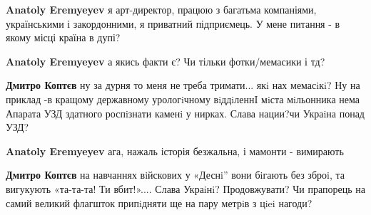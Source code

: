 \begin{itemize}
\begin{itemize}
\begin{itemize}
 
\textbf{Anatoly Eremyeyev} я арт-директор, працюю з багатьма компаніями, українськими і закордонними, я приватний підприємець. У мене питання - в якому місці країна в дупі?

 
\textbf{Anatoly Eremyeyev} а якись факти є? Чи тільки фотки/мемасики і тд?

 
\textbf{Дмитро Коптєв} ну за дурня то меня не треба тримати... якi нах мемасiкi? Ну на приклад -в кращому державному урологiчному вiддiленнI мiста мiльонника нема Апарата УЗД здатного роспiзнати каменi у нирках. Слава нации?чи Украiна понад УЗД?

 
\textbf{Anatoly Eremyeyev} ага, нажаль історія безжальна, і мамонти - вимирають

 
\textbf{Дмитро Коптєв} на навчаннях вiйскових у «Деснi” вони бiгають без зброi, та вигукують «та-та-та! Ти вбит!».... Слава Украiнi? Продовжувати? Чи прапорець на самий великий флагшток припiдняти ще на пару метрiв з цiei нагоди?

 

\end{itemize}
\end{itemize}
\end{itemize}
